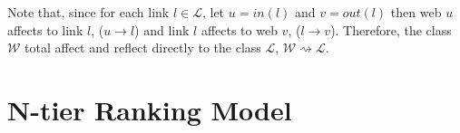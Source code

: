 \documentclass[lnicst]{svmultln}
\begin{document}
Note that, since for each link $l\in \mathcal{L}$, let $u=in(l)$ and $v=out(l)$ then web $u$ affects to link $l$, ($u\rightarrow l$) and link $l$ affects to web $v$, ($l\rightarrow v$). Therefore, the class $\mathcal{W}$ total affect and reflect directly to the class $\mathcal{L}$, $\mathcal{W} \rightsquigarrow \mathcal{L}$.






\section {N-tier Ranking Model}\label{Sect:N-tier}
\end{document}

